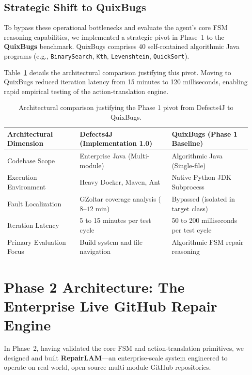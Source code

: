 \documentclass[12pt,a4paper]{report}
\begin{document}
\subsection{Strategic Shift to QuixBugs}
To bypass these operational bottlenecks and evaluate the agent's core FSM reasoning capabilities, we implemented a strategic pivot in Phase~1 to the \textbf{QuixBugs} benchmark. QuixBugs comprises 40 self-contained algorithmic Java programs (e.g., \texttt{BinarySearch}, \texttt{Kth}, \texttt{Levenshtein}, \texttt{QuickSort}). 

Table~\ref{tab:defects4j_vs_quixbugs} details the architectural comparison justifying this pivot. Moving to QuixBugs reduced iteration latency from 15 minutes to 120 milliseconds, enabling rapid empirical testing of the action-translation engine.

\begin{table}[htbp]
\centering
\caption{Architectural comparison justifying the Phase 1 pivot from Defects4J to QuixBugs.}
\label{tab:defects4j_vs_quixbugs}
\begin{tabularx}{\textwidth}{l X X}
\toprule
\textbf{Architectural Dimension} & \textbf{Defects4J (Implementation 1.0)} & \textbf{QuixBugs (Phase 1 Baseline)} \\
\midrule
Codebase Scope & Enterprise Java (Multi-module) & Algorithmic Java (Single-file) \\
Execution Environment & Heavy Docker, Maven, Ant & Native Python JDK Subprocess \\
Fault Localization & GZoltar coverage analysis ($8\text{--}12\text{ min}$) & Bypassed (isolated in target class) \\
Iteration Latency & 5 to 15 minutes per test cycle & 50 to 200 milliseconds per test cycle \\
Primary Evaluation Focus & Build system and file navigation & Algorithmic FSM repair reasoning \\
\bottomrule
\end{tabularx}
\end{table}

\section{Phase 2 Architecture: The Enterprise Live GitHub Repair Engine}
In Phase~2, having validated the core FSM and action-translation primitives, we designed and built \textbf{RepairLAM}---an enterprise-scale system engineered to operate on real-world, open-source multi-module GitHub repositories.
\end{document}
